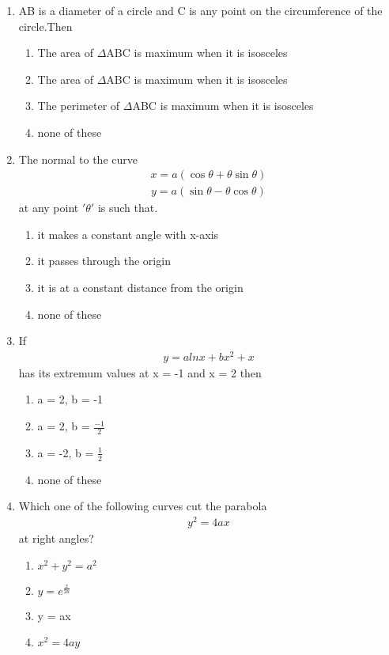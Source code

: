 \begin{enumerate}[label=\arabic*.,ref=\thesubsection.\theenumi]
\item AB is a diameter of a circle and C is any point on the circumference of the circle.Then 
\begin{enumerate}
\item The area of $\Delta$ABC is maximum when it is isosceles
\item The area of $\Delta$ABC is maximum when it is isosceles
\item The perimeter of $\Delta$ABC is maximum when it is isosceles
\item none of these 
\end{enumerate}

\item The normal to the curve 
\begin{align*} 
x = a(\cos \theta + \theta \sin \theta)
\end{align*}
\begin{align*} 
y = a(\sin \theta - \theta \cos \theta) 
\end{align*} at any point $'\theta'$ is such that.
\begin{enumerate}
\item it makes a constant angle with x-axis
\item it passes through the origin 
\item it is at a constant distance from the origin 
\item none of these
\end{enumerate}

\item If 
\begin{align}
y = a lnx + bx^2 + x
\end{align} 
has its extremum values at x = -1 and x = 2 then 
\begin{enumerate}
\item a = 2, b = -1
\item a = 2, b = $\frac{-1}{2}$
\item a = -2, b = $\frac{1}{2}$
\item none of these
\end{enumerate}

\item Which one of the following curves cut the parabola 
\begin{align} 
y^2 = 4ax
\end{align} 
at right angles?
\begin{enumerate}
\item $x^2+ y^2 = a^2$
\item $y = e^{\frac{x}{2a}}$
\item y = ax
\item $x^2 = 4ay$
\end{enumerate}


\end{enumerate}
